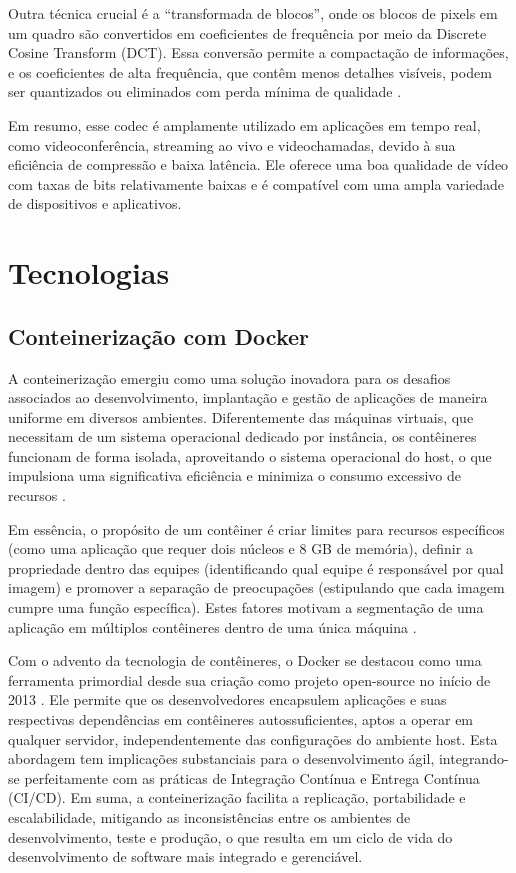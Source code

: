 \documentclass[12pt, %
openright, 
oneside, %
a4paper,    %
brazil]{facom-ufu-abntex2}
\begin{document}
Outra técnica crucial é a ``transformada de blocos'', onde os blocos de pixels
em um quadro são convertidos em coeficientes de frequência por meio da Discrete
Cosine Transform (DCT). Essa conversão permite a compactação de informações, e
os coeficientes de alta frequência, que contêm menos detalhes visíveis, podem
ser quantizados ou eliminados com perda mínima de qualidade \cite{1626286}.

Em resumo, esse codec é amplamente utilizado em aplicações em tempo real, como
videoconferência, streaming ao vivo e videochamadas, devido à sua eficiência de
compressão e baixa latência. Ele oferece uma boa qualidade de vídeo com taxas
de bits relativamente baixas e é compatível com uma ampla variedade de
dispositivos e aplicativos.

\section{Tecnologias}

\subsection{Conteinerização com Docker}

A conteinerização emergiu como uma solução inovadora para os desafios
associados ao desenvolvimento, implantação e gestão de aplicações de maneira
uniforme em diversos ambientes. Diferentemente das máquinas virtuais, que
necessitam de um sistema operacional dedicado por instância, os contêineres
funcionam de forma isolada, aproveitando o sistema operacional do host, o que
impulsiona uma significativa eficiência e minimiza o consumo excessivo de
recursos \cite{burns2018designing}.

Em essência, o propósito de um contêiner é criar limites para recursos
específicos (como uma aplicação que requer dois núcleos e 8 GB de memória),
definir a propriedade dentro das equipes (identificando qual equipe é
responsável por qual imagem) e promover a separação de preocupações
(estipulando que cada imagem cumpre uma função específica). Estes fatores
motivam a segmentação de uma aplicação em múltiplos contêineres dentro de uma
única máquina \cite{burns2018designingpart1}.

Com o advento da tecnologia de contêineres, o Docker se destacou como uma
ferramenta primordial desde sua criação como projeto open-source no início de
2013 \cite{merkel2014}. Ele permite que os desenvolvedores encapsulem
aplicações e suas respectivas dependências em contêineres autossuficientes,
aptos a operar em qualquer servidor, independentemente das configurações do
ambiente host. Esta abordagem tem implicações substanciais para o
desenvolvimento ágil, integrando-se perfeitamente com as práticas de Integração
Contínua e Entrega Contínua (CI/CD). Em suma, a conteinerização facilita a
replicação, portabilidade e escalabilidade, mitigando as inconsistências entre
os ambientes de desenvolvimento, teste e produção, o que resulta em um ciclo de
vida do desenvolvimento de software mais integrado e gerenciável.
\end{document}
